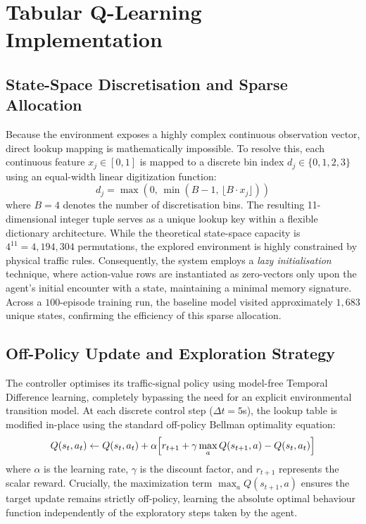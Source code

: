 \documentclass[12pt]{article}
\begin{document}
\section{Tabular Q-Learning Implementation}

\subsection{State-Space Discretisation and Sparse Allocation}
Because the environment exposes a highly complex continuous observation vector, direct lookup mapping is mathematically impossible. To resolve this, each continuous feature $x_j \in [0,1]$ is mapped to a discrete bin index $d_j \in \{0, 1, 2, 3\}$ using an equal-width linear digitization function:
\begin{equation}
	d_j = \max\left(0, \, \min\left(B - 1, \, \lfloor B \cdot x_j \rfloor\right)\right)
\end{equation}
where \( B = 4 \) denotes the number of discretisation bins. The resulting 11-dimensional integer tuple serves as a unique lookup key within a flexible dictionary architecture. While the theoretical state-space capacity is \( 4^{11} = 4{,}194{,}304 \) permutations, the explored environment is highly constrained by physical traffic rules. Consequently, the system employs a \emph{lazy initialisation} technique, where action-value rows are instantiated as zero-vectors only upon the agent's initial encounter with a state, maintaining a minimal memory signature. Across a \( 100 \)-episode training run, the baseline model visited approximately \( 1{,}683 \) unique states, confirming the efficiency of this sparse allocation.


\subsection{Off-Policy Update and Exploration Strategy}
The controller optimises its traffic-signal policy using model-free Temporal Difference learning, completely bypassing the need for an explicit environmental transition model. At each discrete control step ($\Delta t = 5$s), the lookup table is modified in-place using the standard off-policy Bellman optimality equation:
\begin{equation}
	Q(s_t, a_t) \leftarrow Q(s_t, a_t) + \alpha \Bigl[ r_{t+1} + \gamma \max_{a} Q(s_{t+1}, a) - Q(s_t, a_t) \Bigr]
	\label{eq:bellman_update}
\end{equation}
where $\alpha$ is the learning rate, $\gamma$ is the discount factor, and $r_{t+1}$ represents the scalar reward. Crucially, the maximization term $\max_{a} Q(s_{t+1}, a)$ ensures the target update remains strictly off-policy, learning the absolute optimal behaviour function independently of the exploratory steps taken by the agent.
\end{document}
